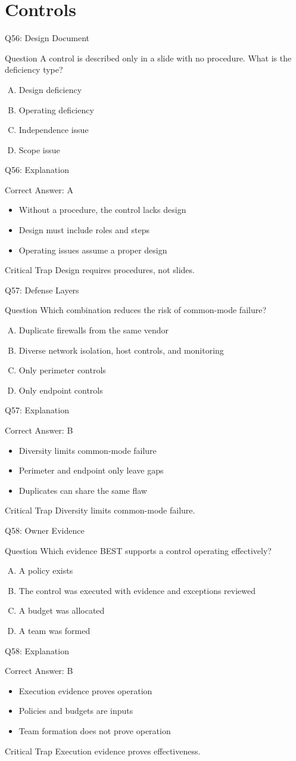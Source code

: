 \documentclass[aspectratio=169]{beamer}
\newcommand{\hq}[7]{%
	\begin{frame}{Q#1: #2}
		\begin{block}{Question}
			#3
		\end{block}
		\begin{enumerate}[(A)]
			#4
		\end{enumerate}
	\end{frame}
	\begin{frame}{Q#1: Explanation}
		\begin{block}{Correct Answer: #5}
			\begin{itemize}
				#6
			\end{itemize}
		\end{block}
		\begin{alertblock}{Critical Trap}
			#7
		\end{alertblock}
	\end{frame}
}
\begin{document}
	\section{Controls}
	
	\hq{56}{Design Document}
	{A control is described only in a slide with no procedure. What is the deficiency type?}
	{\item Design deficiency
		\item Operating deficiency
		\item Independence issue
		\item Scope issue}
	{A}
	{\item Without a procedure, the control lacks design
		\item Design must include roles and steps
		\item Operating issues assume a proper design}
	{Design requires procedures, not slides.}
	
	\hq{57}{Defense Layers}
	{Which combination reduces the risk of common-mode failure?}
	{\item Duplicate firewalls from the same vendor
		\item Diverse network isolation, host controls, and monitoring
		\item Only perimeter controls
		\item Only endpoint controls}
	{B}
	{\item Diversity limits common-mode failure
		\item Perimeter and endpoint only leave gaps
		\item Duplicates can share the same flaw}
	{Diversity limits common-mode failure.}
	
	\hq{58}{Owner Evidence}
	{Which evidence BEST supports a control operating effectively?}
	{\item A policy exists
		\item The control was executed with evidence and exceptions reviewed
		\item A budget was allocated
		\item A team was formed}
	{B}
	{\item Execution evidence proves operation
		\item Policies and budgets are inputs
		\item Team formation does not prove operation}
	{Execution evidence proves effectiveness.}
	
\end{document}
